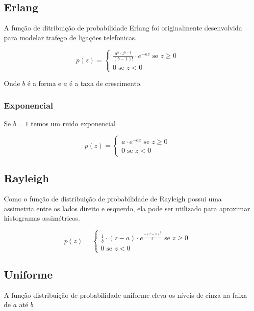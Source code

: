 \documentclass[10pt,a4paper]{article}
\begin{document}
\subsection{Erlang}
A função de ditribuição de probabilidade Erlang foi originalmente desenvolvida para modelar trafego de ligações telefonicas.

\begin{equation}
p(z) = \left\{
    \begin{array}{l}
        \frac{a^{b}\cdot z^{b-1}}{(b - 1)!} \cdot e^{-a z} \text{ se } z \ge 0 \\
        0 \text{ se } z < 0
    \end{array}\right.
\end{equation}

Onde $b$ é a forma e $a$ é a taxa de crescimento.

\subsubsection{Exponencial}
Se $b = 1$ temos um ruido exponencial

\begin{equation}
p(z) = \left\{
    \begin{array}{l}
        a \cdot e^{-a z} \text{ se } z \ge 0 \\
        0 \text{ se } z < 0
    \end{array}\right.
\end{equation}

\subsection{Rayleigh}
Como o função de distribuição de probabilidade de Rayleigh possui uma assimetria entre os lados direito e esquerdo, ela pode ser utilizado para aproximar histogramas assimétricos.

\begin{equation}
p(z) = \left\{
    \begin{array}{l}
        \frac{1}{b} \cdot (z - a) \cdot e^{\frac{-(z-a)^2}{b}} \text{ se } z \ge 0 \\
        0 \text{ se } z < 0
    \end{array}\right.
\end{equation}

\subsection{Uniforme}
A função distribuição de probabilidade uniforme eleva os níveis de cinza na faixa de $a$ até $b$
\end{document}
